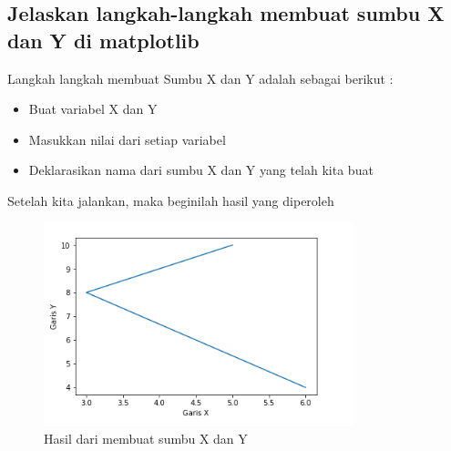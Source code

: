 \subsection{Jelaskan langkah-langkah membuat sumbu X dan Y di matplotlib}
Langkah langkah membuat Sumbu X dan Y adalah sebagai berikut :
\begin{itemize}
    \item Buat variabel X dan Y
    \item Masukkan nilai dari setiap variabel
    
    \item Deklarasikan nama dari sumbu X dan Y yang telah kita buat
    
\end{itemize}

Setelah kita jalankan, maka beginilah hasil yang diperoleh
\begin{figure}[H]
    \includegraphics[width=9cm]{figures/6/Teori/1174038/1.png}
    \caption{Hasil dari membuat sumbu X dan Y}
    \centering
\end{figure}


